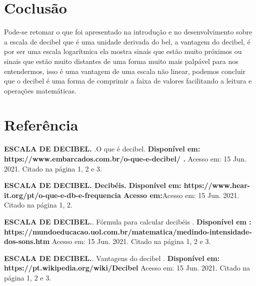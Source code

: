 \documentclass{article}
\begin{document}
\section{Coclusão}

Pode-se retomar o que foi apresentado na introdução e no desenvolvimento sobre a escala de decibel que é uma unidade derivada do bel, a  vantagem do decibel, é por ser uma escala logarítmica ela mostra sinais que estão muito próximos ou sinais que estão muito distantes de uma forma muito mais palpável para nos entendermos, isso é uma vantagem de uma escala não linear, podemos concluir  que o decibel é uma forma de comprimir a faixa de valores facilitando a leitura e operações matemáticas.
\newpage

\section{Referência}
\textbf{ESCALA DE DECIBEL. }.O que é decibel. \textbf{Disponível em: https://www.embarcados.com.br/o-que-e-decibel/ .} Acesso em: 15 Jun. 2021. Citado na página 1, 2 e 3.
\newline

\textbf{ESCALA DE DECIBEL. Decibéis. Disponível em: https://www.hear-it.org/pt/o-que-e-db-e-frequencia Acesso em:}Acesso em: 15  Jun. 2021. Citado na página 1, 2.
\newline

\textbf{ESCALA DE DECIBEL.}. Fórmula para calcular decibéis . \textbf{Disponível em : https://mundoeducacao.uol.com.br/matematica/medindo-intensidade-dos-sons.htm } Acesso em: 15 Jun. 2021. Citado na página 1, 2 e 3.
\newline

\textbf{ESCALA DE DECIBEL.}. Vantagens do decibel . \textbf{Disponível em: https://pt.wikipedia.org/wiki/Decibel}  Acesso em: 15  Jun. 2021. Citado na página 1, 2 e 3.

      
      
\end{document}

